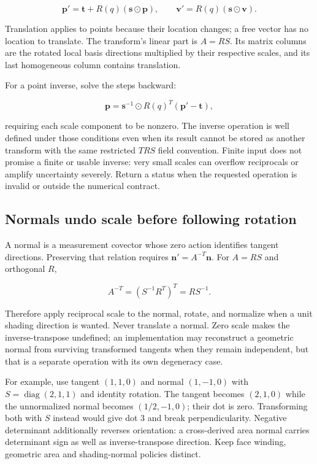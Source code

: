 \[
\mathbf p'=\mathbf t+R(q)(\mathbf s\odot\mathbf p),
\qquad
\mathbf v'=R(q)(\mathbf s\odot\mathbf v).
\]

Translation applies to points because their location changes; a free vector has no location to translate. The transform's linear part is \(A=RS\). Its matrix columns are the rotated local basis directions multiplied by their respective scales, and its last homogeneous column contains translation.

For a point inverse, solve the steps backward:

\[
\mathbf p=\mathbf s^{-1}\odot R(q)^T(\mathbf p'-\mathbf t),
\]

requiring each scale component to be nonzero. The inverse operation is well defined under those conditions even when its result cannot be stored as another transform with the same restricted \(TRS\) field convention. Finite input does not promise a finite or usable inverse: very small scales can overflow reciprocals or amplify uncertainty severely. Return a status when the requested operation is invalid or outside the numerical contract.

\subsection{Normals undo scale before following rotation}\label{01-foundations-i-ch019-normals-undo-scale-before-following-rotation}

A normal is a measurement covector whose zero action identifies tangent directions. Preserving that relation requires \(\mathbf n'=A^{-T}\mathbf n\). For \(A=RS\) and orthogonal \(R\),

\[
A^{-T}=\left(S^{-1}R^T\right)^T=RS^{-1}.
\]

Therefore apply reciprocal scale to the normal, rotate, and normalize when a unit shading direction is wanted. Never translate a normal. Zero scale makes the inverse-transpose undefined; an implementation may reconstruct a geometric normal from surviving transformed tangents when they remain independent, but that is a separate operation with its own degeneracy case.

For example, use tangent \((1,1,0)\) and normal \((1,-1,0)\) with \(S=\operatorname{diag}(2,1,1)\) and identity rotation. The tangent becomes \((2,1,0)\) while the unnormalized normal becomes \((1/2,-1,0)\); their dot is zero. Transforming both with \(S\) instead would give dot \(3\) and break perpendicularity. Negative determinant additionally reverses orientation: a cross-derived area normal carries determinant sign as well as inverse-transpose direction. Keep face winding, geometric area and shading-normal policies distinct.

